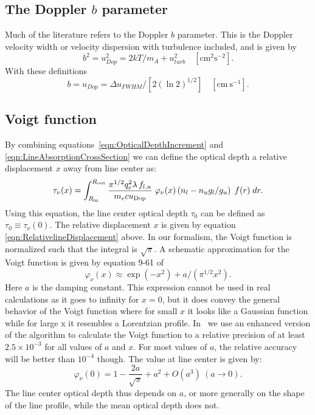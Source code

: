 \subsection{The Doppler $b$ parameter}

Much of the literature refers to the Doppler $b$ parameter.
This is the
Doppler velocity width or velocity dispersion with turbulence included,
and is given by
\begin{equation}
{b^2} = u_{Dop}^2 = 2kT/{m_A} + u_{turb}^2
\quad [\mathrm{cm}^2 \mathrm{s}^{-2}].
\end{equation}
With these definitions
\begin{equation}
b = {u_{Dop}} = \Delta {u_{FWHM}}/\left[ {2{{\left( {\ln 2} \right)}^{1/2}}}
\right]
\quad  [\mathrm{cm~s}^{-1}].
\end{equation}

\subsection{Voigt function}

By combining equations~\ref{eqn:OpticalDepthIncrement} and \ref{eqn:LineAbsorptionCrossSection}
we can define the optical depth a relative displacement $x$ away from line center
as:
\begin{equation}
\label{eqn:LineOpticalDepth}
\tau_\nu(x) = \int_{R_{\rm in}}^{R_{\rm out}} \frac{{{\pi ^{1/2}}q_e^2\lambda
\,{f_{l,u}}}}{{{m_e}c{u_{\rm Dop}}}}\;{\varphi _\nu }(x)
\left({{n_l} - {n_u}{g_l}/{g_u}}\right)\;f(r)\;dr.
\end{equation}
Using this equation, the line center optical depth $\tau_0$ can be defined as
$\tau_0 \equiv \tau_\nu(0)$.
The relative displacement $x$ is given by
equation \ref{eqn:RelativelineDisplacement} above.
In our formalism, the Voigt function
is normalized such that the integral is $\sqrt\pi$.
A schematic approximation for the Voigt function is given by equation 9-61 of \citet{Mihalas1978}
\begin{equation}
\label{eqn:VoigtFunctionApproximation}
{\varphi _\nu }(x) \approx \exp ( - {x^2}) + a/({\pi ^{1/2}}{x^2}) .
\end{equation}
Here $a$ is the damping constant. This expression cannot be used in real
calculations as it goes to infinity for $x=0$, but it does convey the general
behavior of the Voigt function where for small $x$ it looks like a Gaussian
function while for large x it resembles a Lorentzian profile. In \Cloudy\ we
use an enhanced version of the  algorithm \citep{Wells1999}
to calculate the Voigt function to a relative precision of at least
$2.5\times10^{-3}$ for all values of $a$ and $x$. For most values of $a$, the
relative accuracy will be better than $10^{-4}$ though.
The value at line center is given by:
\begin{equation}
\label{eqn:VoigtFunctionCenter}
{\varphi _\nu }(0) = 1 - \frac{2 a}{\sqrt\pi} + a^2 + O(a^3)\ (a \rightarrow 0).
\end{equation}
The line center optical depth thus depends on $a$, or more generally on the
shape of the line profile, while the mean optical depth does not.

